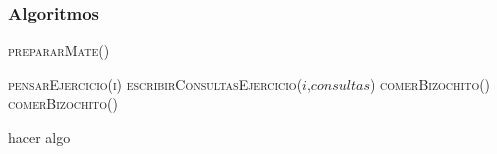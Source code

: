\subsubsection*{Algoritmos}
\begin{algorithm}[H]
  \begin{algorithmic}[1]
    \State {} 

    \State {} 

    \State {}

    \State \textsc{prepararMate()} 

    \State \textsc{pensarEjercicio(i)}
      \State \textsc{escribirConsultasEjercicio($i$,$consultas$)}
    \Else
      \State \textsc{comerBizochito()}
    \EndIf
      \State \textsc{comerBizochito()}
    \EndWhile

         \State hacer algo
    \EndFor

    \State {}
  \end{algorithmic}
\end{algorithm}
\newpage

